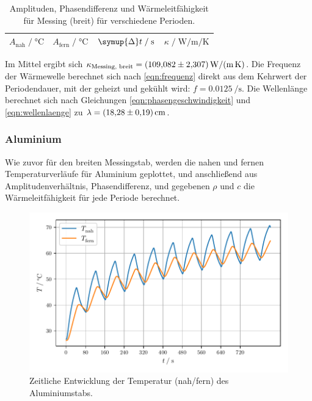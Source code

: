 \begin{table}[H]
     \centering
     \caption{Amplituden, Phasendifferenz und Wärmeleitfähigkeit für Messing (breit) für verschiedene Perioden.}
     \label{tab:messing_breit}
     \begin{tabular}{c c c c}
      \toprule
      $A_\text{nah} \;/\; \si{\celsius}$ &
      $A_\text{fern} \;/\; \si{\celsius}$ &
      $\symup{\Delta}t \;/\; \si{\second}$ &
      $\kappa \;/\; \si{\watt\per\meter\per\kelvin}$ \\
      \midrule
      
      \bottomrule
     \end{tabular}
\end{table}

Im Mittel ergibt sich $\kappa_\text{Messing, breit} = \SI{109.082 \pm 2.307}{\watt\per\meter\per\kelvin}$.
Die Frequenz der Wärmewelle berechnet sich nach \autoref{eqn:frequenz} direkt aus dem Kehrwert der Periodendauer,
mit der geheizt und gekühlt wird: $f = \SI{0.0125}{\per\second}$.
Die Wellenlänge berechnet sich nach Gleichungen \eqref{eqn:phasengeschwindigkeit} und \eqref{eqn:wellenlaenge} zu $\lambda = \SI{18.28 \pm 0.19}{\centi\meter}$.


\subsubsection{Aluminium}

Wie zuvor für den breiten Messingstab,
werden die nahen und fernen Temperaturverläufe für Aluminium geplottet,
und anschließend aus Amplitudenverhältnis, Phasendifferenz, und gegebenen $\rho$ und $c$
die Wärmeleitfähigkeit für jede Periode berechnet.

\begin{figure}[H]
  \centering
  \includegraphics{build/plot_dynamisch_aluminium.pdf}
  \caption{Zeitliche Entwicklung der Temperatur (nah/fern) des Aluminiumstabs.}
  \label{fig:dynamisch_aluminium}
\end{figure}

